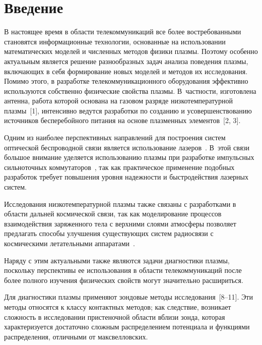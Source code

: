       \begin{multicols}{2}
      
            \label{st\stat}

\section{Введение}

В настоящее время в области телекоммуникаций все более востребованными становятся 
информационные технологии, основанные на использовании математических моделей и численных 
методов физики плазмы. Поэтому особенно актуальным является решение разнообразных задач анализа 
поведения плазмы, включающих в себя формирование новых моделей и методов их исследования. 
Помимо этого, в разработке телекоммуникационного оборудования эффективно используются 
собственно физические свойства плазмы. В~частности, изготовлена антенна, работа которой основана 
на газовом разряде низкотемпературной плазмы~[1], интенсивно ведутся разработки по созданию и 
усовершенствованию источников бесперебойного питания на основе плазменных элементов~[2, 3]. 
      
      Одним из наиболее перспективных направлений для построения систем оптической 
беспроводной связи является использование лазеров~\cite{4-k, 5-k}. В~этой связи большое внимание 
уделяется использованию плазмы при разработке импульсных сильноточных коммутаторов~\cite{6-k}, 
так как практическое применение подобных разработок требует повышения уровня надежности и 
быстродействия лазерных систем.
      
      Исследования низкотемпературной плазмы также связаны с разработками в области дальней 
космической связи, так как моделирование процессов взаимодействия заряженного тела с верхними 
слоями атмосферы позволяет предлагать способы улучшения существующих систем радиосвязи с 
космическими летательными аппаратами~\cite{7-k}. 
      
      Наряду с этим актуальными также являются задачи диагностики плазмы, поскольку перспективы 
ее использования в области телекоммуникаций после более полного изучения физических свойств 
могут значительно расшириться. 

Для диагностики плазмы применяют зондовые методы исследования~[8--11]. Эти методы относятся к 
классу контактных методов; как следствие, возникает сложность в исследовании пристеночной области 
вблизи зонда, которая характеризуется достаточно сложным распределением потенциала и функциями 
распределения, отличными от максвелловских. 


\end{multicols}
